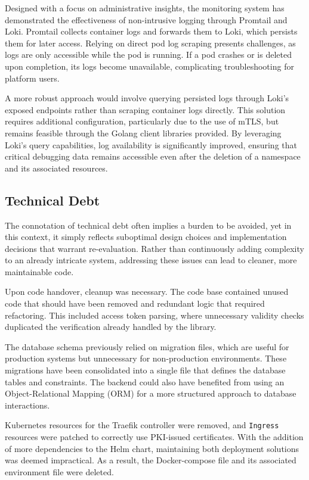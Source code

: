 Designed with a focus on administrative insights, the monitoring system has demonstrated the effectiveness of non-intrusive logging through Promtail and Loki. Promtail collects container logs and forwards them to Loki, which persists them for later access. Relying on direct pod log scraping presents challenges, as logs are only accessible while the pod is running. If a pod crashes or is deleted upon completion, its logs become unavailable, complicating troubleshooting for platform users.

A more robust approach would involve querying persisted logs through Loki's exposed endpoints rather than scraping container logs directly. This solution requires additional configuration, particularly due to the use of mTLS, but remains feasible through the Golang client libraries provided. By leveraging Loki's query capabilities, log availability is significantly improved, ensuring that critical debugging data remains accessible even after the deletion of a namespace and its associated resources.

\subsection{Technical Debt}
The connotation of technical debt often implies a burden to be avoided, yet in this context, it simply reflects suboptimal design choices and implementation decisions that warrant re-evaluation. Rather than continuously adding complexity to an already intricate system, addressing these issues can lead to cleaner, more maintainable code.

Upon code handover, cleanup was necessary. The code base contained unused code that should have been removed and redundant logic that required refactoring. This included access token parsing, where unnecessary validity checks duplicated the verification already handled by the library.

The database schema previously relied on migration files, which are useful for production systems but unnecessary for non-production environments. These migrations have been consolidated into a single file that defines the database tables and constraints. The backend could also have benefited from using an Object-Relational Mapping (ORM) for a more structured approach to database interactions.

Kubernetes resources for the Traefik controller were removed, and \texttt{Ingress} resources were patched to correctly use PKI-issued certificates. With the addition of more dependencies to the Helm chart, maintaining both deployment solutions was deemed impractical. As a result, the Docker-compose file and its associated environment file were deleted.


